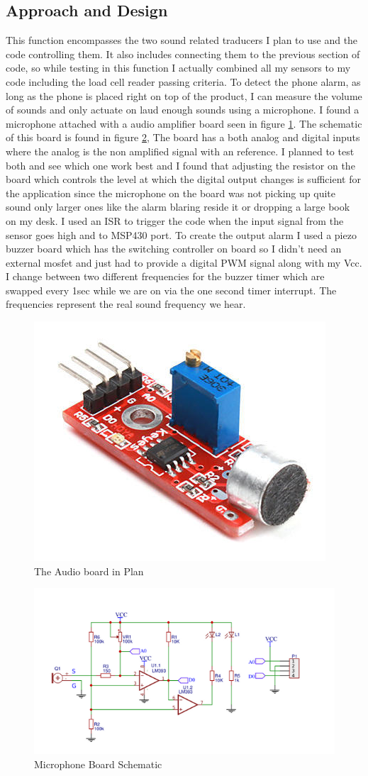 \documentclass[11pt]{article}
\begin{document}
\subsection*{Approach and Design}
This function encompasses the two sound related traducers I plan to use and the code controlling them.
It also includes connecting them to the previous section of code, so while testing in this function I actually combined all my sensors to my code including the load cell reader passing criteria.
To detect the phone alarm, as long as the phone is placed right on top of the product, I can measure the volume of sounds and only actuate on laud enough sounds using a microphone. 
I found a microphone attached with a audio amplifier board seen in figure \ref{fig:audioboard}.
The schematic of this board is found in figure \ref{fig:audioscem},
The board has a both analog and digital inputs where the analog is the non amplified signal with an reference.
I planned to test both and see which one work best and I found that adjusting the resistor on the board which controls the level at which the digital output changes is sufficient for the application since the microphone on the board was not picking up quite sound only larger ones like the alarm blaring reside it or dropping a large book on my desk. 
I used an ISR to trigger the code when the input signal from the sensor goes high and to MSP430 port.  
To create the output alarm I used a piezo buzzer board which has the switching controller on board so I didn't need an external mosfet and just had to provide a digital PWM signal along with my Vcc.
I change between two different frequencies for the buzzer timer which are swapped every 1sec while we are on via the one second timer interrupt.
The frequencies represent the real sound frequency we hear.  

\begin{figure}
	\centering
	\includegraphics[width = 0.2\linewidth]{soundsensor}
	\caption{The Audio board in Plan}
	\label{fig:audioboard}
\end{figure}
\begin{figure}
	\centering
	\includegraphics[width = 0.8\linewidth]{SoundScem}
	\caption{Microphone Board Schematic}
	\label{fig:audioscem}
\end{figure}
\end{document}
